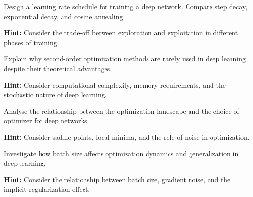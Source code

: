 \begin{problem}
Design a learning rate schedule for training a deep network. Compare step decay, exponential decay, and cosine annealing.

\textbf{Hint:} Consider the trade-off between exploration and exploitation in different phases of training.
\end{problem}

\begin{problem}
Explain why second-order optimization methods are rarely used in deep learning despite their theoretical advantages.

\textbf{Hint:} Consider computational complexity, memory requirements, and the stochastic nature of deep learning.
\end{problem}

\begin{problem}
Analyse the relationship between the optimization landscape and the choice of optimizer for deep networks.

\textbf{Hint:} Consider saddle points, local minima, and the role of noise in optimization.
\end{problem}

\begin{problem}
Investigate how batch size affects optimization dynamics and generalization in deep learning.

\textbf{Hint:} Consider the relationship between batch size, gradient noise, and the implicit regularization effect.
\end{problem}

